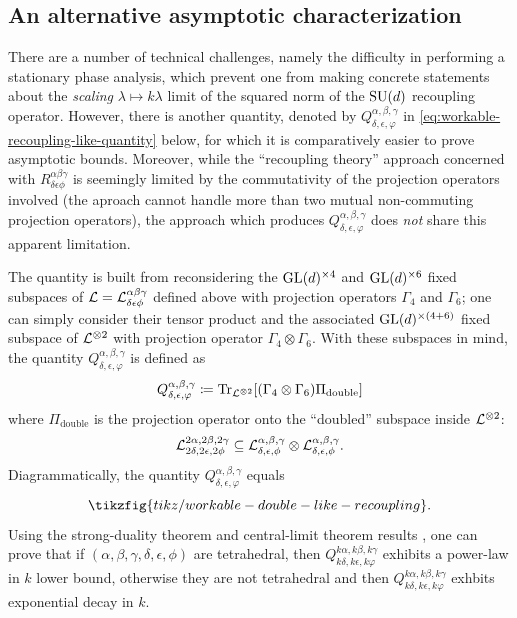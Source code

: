 \documentclass[notitlepage, 10pt]{article}
\begin{document}
\subsection{An alternative asymptotic characterization}

There are a number of technical challenges, namely the difficulty in performing a stationary phase analysis, which prevent one from making concrete statements about the \textit{scaling} $\lambda \mapsto k\lambda$ limit of the squared norm of the $\operatorname{SU}(d)$ recoupling operator.
However, there is another quantity, denoted by $Q^{\alpha,\beta,\gamma}_{\delta,\epsilon,\varphi}$ in \cref{eq:workable-recoupling-like-quantity} below, for which it is comparatively easier to prove asymptotic bounds.
Moreover, while the ``recoupling theory'' approach concerned with $R^{\alpha\beta\gamma}_{\delta\epsilon\phi}$ is seemingly limited by the commutativity of the projection operators involved (the aproach cannot handle more than two mutual non-commuting projection operators), the approach which produces $Q^{\alpha,\beta,\gamma}_{\delta,\epsilon,\varphi}$ does \textit{not} share this apparent limitation. 

The quantity is built from reconsidering the $\operatorname{GL}(d)^{\times 4}$ and $\operatorname{GL}(d)^{\times 6}$ fixed subspaces of $\mathcal L = \mathcal L^{\alpha \beta \gamma}_{\delta \epsilon \phi}$ defined above with projection operators $\Gamma_{4}$ and $\Gamma_{6}$; one can simply consider their tensor product and the associated $\operatorname{GL}(d)^{\times (4 + 6)}$ fixed subspace of $\mathcal L^{\otimes 2}$ with projection operator $\Gamma_{4} \otimes \Gamma_{6}$.
With these subspaces in mind, the quantity $Q^{\alpha,\beta,\gamma}_{\delta,\epsilon,\varphi}$ is defined as 
\begin{equation}
    Q^{\alpha,\beta,\gamma}_{\delta,\epsilon,\varphi} \coloneqq \operatorname{Tr}_{\mathcal L^{\otimes 2}}[(\Gamma_{4} \otimes \Gamma_{6}) \Pi_{\mathrm{double}}]
\end{equation}
where $\Pi_{\mathrm{double}}$ is the projection operator onto the ``doubled'' subspace inside $\mathcal L^{\otimes 2}$:
\begin{equation}
    \mathcal L^{2\alpha, 2\beta, 2\gamma}_{2\delta, 2\epsilon, 2\phi} \subseteq \mathcal L^{\alpha, \beta, \gamma}_{\delta, \epsilon, \phi} \otimes \mathcal L^{\alpha, \beta, \gamma}_{\delta, \epsilon, \phi}.
\end{equation}
Diagrammatically, the quantity $Q^{\alpha,\beta,\gamma}_{\delta,\epsilon,\varphi}$ equals
\begin{equation}
    \label{eq:workable-recoupling-like-quantity}
    \tikzfig{tikz/workable-double-like-recoupling}.
\end{equation}
Using the strong-duality theorem and central-limit theorem results \cite[Theorem 1 \& Proposition 3.1]{franks2020minimal}, one can prove that if $(\alpha,\beta,\gamma,\delta,\epsilon,\phi)$ are tetrahedral, then $Q^{k\alpha,k\beta,k\gamma}_{k\delta,k\epsilon,k\varphi}$ exhibits a power-law in $k$ lower bound, otherwise they are not tetrahedral and then $Q^{k\alpha,k\beta,k\gamma}_{k\delta,k\epsilon,k\varphi}$ exhbits exponential decay in $k$.
\end{document}
